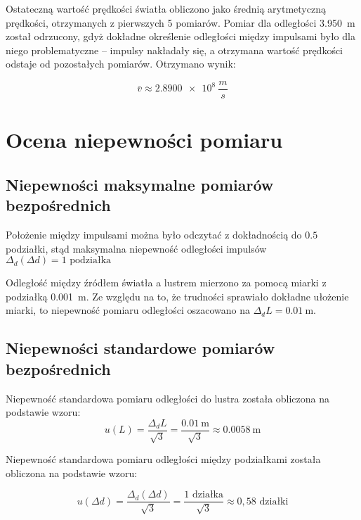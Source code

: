\documentclass[a4paper,12pt]{article}
\begin{document}
Ostateczną wartość prędkości światła obliczono jako średnią arytmetyczną prędkości, otrzymanych z pierwszych 5 pomiarów. Pomiar dla odległości \SI{3.950}{\meter} został odrzucony, gdyż dokładne określenie odległości między impulsami było dla niego problematyczne -- impulsy nakładały się, a otrzymana wartość prędkości odstaje od pozostałych pomiarów. Otrzymano wynik:

\begin{equation*}
    \bar{v} \approx \SI{2.8900e8}{\frac{m}{s}}
\end{equation*}


\section{Ocena niepewności pomiaru}

\subsection{Niepewności maksymalne pomiarów bezpośrednich}

Położenie między impulsami można było odczytać z dokładnością do $\num{0,5}$ podziałki, stąd maksymalna niepewność odległości impulsów $\Delta_d(\Delta d) = 1 \text{ podziałka}$

Odległość między źródłem światła a lustrem mierzono za pomocą miarki z podziałką \SI{0.001}{\meter}. Ze względu na to, że trudności sprawiało dokładne ułożenie miarki, to niepewność pomiaru odległości oszacowano na $\Delta_d L = \SI{0.01}{\meter}$.

\subsection{Niepewności standardowe pomiarów bezpośrednich}

Niepewność standardowa pomiaru odległości do lustra została obliczona na podstawie wzoru:
\begin{equation*}
    u(L) = \frac{\Delta_d L}{\sqrt{3}} = \frac{\SI{0.01}{\meter}}{\sqrt{3}} \approx \SI{0.0058}{\meter}
\end{equation*}

Niepewność standardowa pomiaru odległości między podziałkami została obliczona na podstawie wzoru:


\begin{equation*}
    u(\Delta d) = \frac{\Delta_d(\Delta d)}{\sqrt{3}} = \frac{1 \text{ działka}}{\sqrt{3}} \approx 0{,}58 \text{ działki}
\end{equation*}
\end{document}
